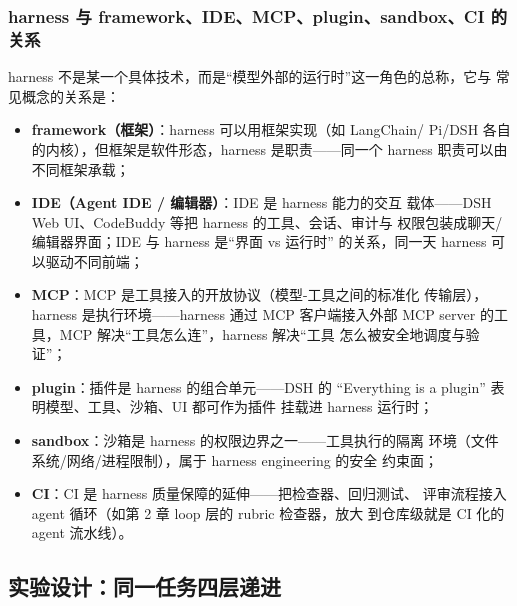 \subsubsection{harness 与 framework、IDE、MCP、plugin、sandbox、CI 的关系}

harness 不是某一个具体技术，而是``模型外部的运行时''这一角色的总称，它与
常见概念的关系是：
\begin{itemize}[leftmargin=4em,itemsep=0pt,topsep=2pt]
    \item \textbf{framework（框架）}：harness 可以用框架实现（如 LangChain/
          Pi/DSH 各自的内核），但框架是软件形态，harness 是职责——同一个
          harness 职责可以由不同框架承载；
    \item \textbf{IDE（Agent IDE / 编辑器）}：IDE 是 harness 能力的交互
          载体——DSH Web UI、CodeBuddy 等把 harness 的工具、会话、审计与
          权限包装成聊天/编辑器界面；IDE 与 harness 是``界面 vs 运行时''
          的关系，同一天 harness 可以驱动不同前端；
    \item \textbf{MCP}：MCP 是工具接入的开放协议（模型-工具之间的标准化
          传输层），harness 是执行环境——harness 通过 MCP 客户端接入外部
          MCP server 的工具，MCP 解决``工具怎么连''，harness 解决``工具
          怎么被安全地调度与验证''；
    \item \textbf{plugin}：插件是 harness 的组合单元——DSH 的
          ``Everything is a plugin'' 表明模型、工具、沙箱、UI 都可作为插件
          挂载进 harness 运行时；
    \item \textbf{sandbox}：沙箱是 harness 的权限边界之一——工具执行的隔离
          环境（文件系统/网络/进程限制），属于 harness engineering 的安全
          约束面；
    \item \textbf{CI}：CI 是 harness 质量保障的延伸——把检查器、回归测试、
          评审流程接入 agent 循环（如第 2 章 loop 层的 rubric 检查器，放大
          到仓库级就是 CI 化的 agent 流水线）。
\end{itemize}

\subsection{实验设计：同一任务四层递进}

